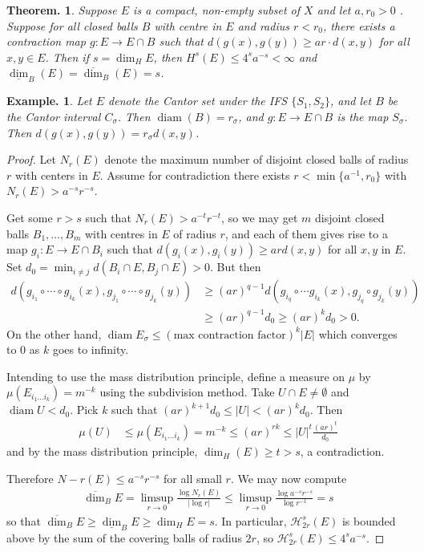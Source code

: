 \documentclass[11pt, a4paper]{memoir}
\theoremstyle{change}
\newtheorem{theorem}{Theorem.}[section]
\theoremstyle{plain}
\theoremstyle{nonumberplain}
\newtheorem{example}{Example.}
\newtheorem{proof}{Proof}
\DeclareMathOperator{\diam}{diam}
\numberwithin{equation}{section}
\begin{document}
\begin{theorem}
    Suppose $E$ is a compact, non-empty subset of $X$ and let $a,r_0>0$ .
    Suppose for all closed balls $B$ with centre in $E$ and radius $r<r_0$, there exists a contraction map $g:E\to E\cap B$ such that $d(g(x),g(y))\geq ar\cdot d(x,y)$ for all $x,y\in E$.
    Then if $s=\dim_HE$, then $H^s(E)\leq 4^sa^{-s}<\infty$ and $\underline{\dim}_B(E)=\overline{\dim}_B(E)=s$.
\end{theorem}
\begin{example}
    Let $E$ denote the Cantor set under the IFS $\{S_1,S_2\}$, and let $B$ be the Cantor interval $C_\sigma$.
    Then $\diam(B)=r_\sigma$, and $g:E\to E\cap B$ is the map $S_\sigma$.
    Then $d(g(x),g(y))=r_\sigma d(x,y)$.
\end{example}
\begin{proof}
    Let $N_r(E)$ denote the maximum number of disjoint closed balls of radius $r$ with centers in $E$.
    Assume for contradiction there exists $r<\min\{a^{-1},r_0\}$ with $N_r(E)>a^{-s}r^{-s}$.

    Get some $r>s$ such that $N_r(E)>a^{-t}r^{-t}$, so we may get $m$ disjoint closed balls $B_1,\ldots, B_m$ with centres in $E$ of radius $r$, and each of them gives rise to a map $g_i:E\to E\cap B_i$ such that $d(g_i(x),g_i(y))\geq ard(x,y)$ for all $x,y$ in $E$.
    Set $d_0=\min_{i\neq j}d(B_i\cap E,B_j\cap E)>0$.
    But then
    \begin{align*}
        d(g_{i_1}\circ\cdots\circ g_{i_k}(x),g_{j_1}\circ\cdots\circ g_{j_k}(y)) &\geq (ar)^{q-1} d(g_{i_q}\circ\cdots g_{i_k}(x),g_{j_q}\circ g_{j_k}(y))\\
                                                                                 &\geq (ar)^{q-1}d_0\geq(ar)^kd_0>0.
    \end{align*}
    On the other hand, $\diam E_\sigma\leq(\text{max contraction factor})^k|E|$ which converges to $0$ as $k$ goes to infinity.

    Intending to use the mass distribution principle, define a measure on $\mu$ by $\mu(E_{i_1\ldots i_k})=m^{-k}$ using the subdivision method.
    Take $U\cap E\neq\emptyset$ and $\diam U<d_0$.
    Pick $k$ such that $(ar)^{k+1}d_0\leq|U|<(ar)^kd_0$.
    Then
    \begin{align*}
        \mu(U)&\leq\mu(E_{i_1\ldots i_k})=m^{-k}\leq (ar)^{rk}\leq|U|^t\frac{(ar)^t}{d_0}
    \end{align*}
    and by the mass distribution principle, $\dim_H(E)\geq t>s$, a contradiction.

    Therefore $N-r(E)\leq a^{-s}r^{-s}$ for all small $r$.
    We may now compute
    \begin{align*}
        \overline{\dim}_BE = \limsup_{r\to 0}\frac{\log N_r(E)}{|\log r|}\leq\limsup_{r\to 0}\frac{\log a^{-s}r^{-s}}{\log r^{-1}}=s
    \end{align*}
    so that $\overline{\dim}_BE\geq\underline{\dim}_BE\geq\dim_HE=s$.
    In particular, $\mathcal{H}^s_{2r}(E)$ is bounded above by the sum of the covering balls of radius $2r$, so $\mathcal{H}^s_{2r}(E)\leq 4^sa^{-s}$.
\end{proof}
\end{document}
